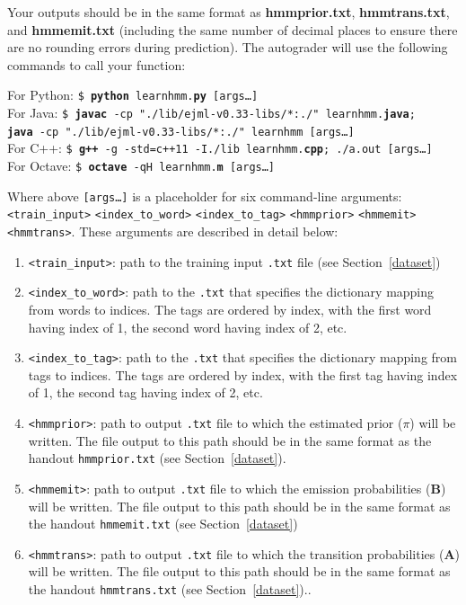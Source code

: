 \documentclass{article}
\begin{document}
Your outputs should be in the same format as \textbf{hmmprior.txt}, \textbf{hmmtrans.txt}, and \textbf{hmmemit.txt} (including the same number of decimal places to ensure there are no rounding errors during prediction). The autograder will use the following commands to call your function:

\begin{tabbing}
For Python: \=\texttt{\$ \textbf{python} learnhmm.\textbf{py} [args\dots]}\\
For Java: \>\texttt{\$ \textbf{javac} -cp "./lib/ejml-v0.33-libs/*:./" learnhmm.\textbf{java};\\ \>  \textbf{java} -cp "./lib/ejml-v0.33-libs/*:./" learnhmm [args\dots]}\\
For C++: \>\texttt{\$ \textbf{g++} -g -std=c++11 -I./lib learnhmm.\textbf{cpp}; ./a.out [args\dots]}\\
For Octave: \>\texttt{\$ \textbf{octave} -qH learnhmm.\textbf{m} [args\dots]}
\end{tabbing}

Where above \texttt{[args\dots]} is a placeholder for six command-line arguments:\texttt{<train\_input>} \texttt{<index\_to\_word>} \texttt{<index\_to\_tag>} \texttt{<hmmprior>} \texttt{<hmmemit>} \texttt{<hmmtrans>}. These arguments are described in detail below:
\begin{enumerate}
    \item \texttt{<train\_input>}: path to the training input \texttt{.txt} file (see Section~\ref{dataset})
    \item \texttt{<index\_to\_word>}: path to the \texttt{.txt} that specifies the dictionary mapping from words to indices. The tags are ordered by index, with the first word having index of 1, the second word having index of 2, etc.
    \item \texttt{<index\_to\_tag>}: path to the \texttt{.txt} that specifies the dictionary mapping from tags to indices. The tags are ordered by index, with the first tag having index of 1, the second tag having index of 2, etc.
    \item \texttt{<hmmprior>}: path to output \texttt{.txt} file to which the estimated prior (\boldmath${\pi}$) will be written. The file output to this path should be in the same format as the handout \texttt{hmmprior.txt} (see Section~\ref{dataset}).
    \item \texttt{<hmmemit>}: path to output \texttt{.txt} file to which the emission probabilities ($\mathbf B$) will be written. The file output to this path should be in the same format as the handout \texttt{hmmemit.txt} (see Section~\ref{dataset})
    \item \texttt{<hmmtrans>}: path to output \texttt{.txt} file to which the transition probabilities ($\mathbf A$) will be written. The file output to this path should be in the same format as the handout \texttt{hmmtrans.txt} (see Section~\ref{dataset})..
\end{enumerate}
\end{document}
